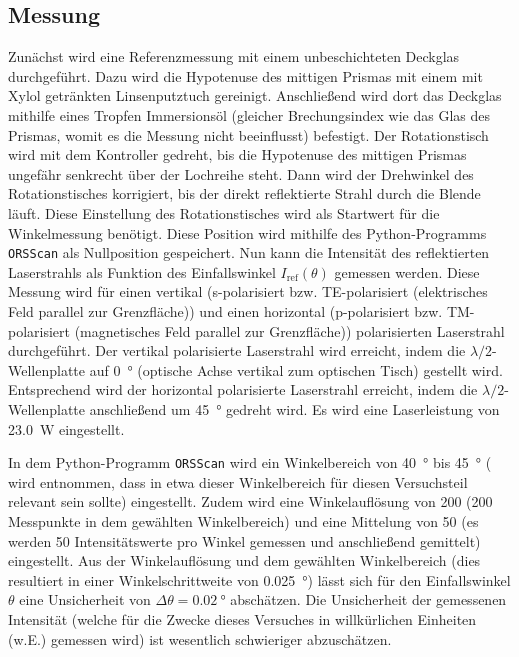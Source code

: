 \subsection{Messung}\label{subsec:teil1_messung}
Zunächst wird eine Referenzmessung mit einem unbeschichteten Deckglas durchgeführt. Dazu wird die Hypotenuse des mittigen Prismas mit einem mit Xylol getränkten
Linsenputztuch gereinigt. Anschließend wird dort das Deckglas mithilfe eines Tropfen Immersionsöl (gleicher Brechungsindex wie das Glas des Prismas, womit es
die Messung nicht beeinflusst) befestigt. Der Rotationstisch wird mit dem Kontroller gedreht, bis die Hypotenuse des mittigen Prismas ungefähr senkrecht über der Lochreihe steht. Dann wird der Drehwinkel des
Rotationstisches korrigiert, bis der direkt reflektierte Strahl durch die Blende läuft. Diese Einstellung des Rotationstisches wird als Startwert für die Winkelmessung
benötigt. Diese Position wird mithilfe des Python-Programms \texttt{ORSScan} als Nullposition gespeichert. Nun kann die Intensität des reflektierten Laserstrahls
als Funktion des Einfallswinkel $I_{\mathrm{ref}}(\theta)$ gemessen werden. Diese Messung wird für einen vertikal (s-polarisiert bzw. TE-polarisiert (elektrisches Feld
parallel zur Grenzfläche)) und einen horizontal (p-polarisiert bzw. TM-polarisiert (magnetisches Feld parallel zur Grenzfläche))
polarisierten Laserstrahl durchgeführt. Der vertikal polarisierte Laserstrahl wird erreicht, indem die $\lambda/2$-Wellenplatte auf \SI{0}{\degree} (optische Achse
vertikal zum optischen Tisch) gestellt wird. Entsprechend wird der horizontal polarisierte Laserstrahl erreicht, indem die $\lambda/2$-Wellenplatte anschließend
um \SI{45}{\degree} gedreht wird. Es wird eine Laserleistung von \SI{23,0}{\watt} eingestellt.\par
In dem Python-Programm \texttt{ORSScan} wird ein Winkelbereich von \SI{40}{\degree} bis \SI{45}{\degree} (\cite{prism} wird entnommen, dass in etwa dieser
Winkelbereich für diesen Versuchsteil relevant sein sollte) eingestellt. Zudem wird eine Winkelauflösung von 200 (200 Messpunkte in dem gewählten Winkelbereich) und
eine Mittelung von 50 (es werden 50 Intensitätswerte pro Winkel gemessen und anschließend gemittelt) eingestellt. Aus der Winkelauflösung und dem gewählten Winkelbereich
(dies resultiert in einer Winkelschrittweite von \SI{0,025}{\degree}) lässt sich für den Einfallswinkel $\theta$ eine Unsicherheit von $\Delta \theta = \SI{0,02}{\degree}$ abschätzen.
Die Unsicherheit der gemessenen Intensität (welche für die Zwecke dieses Versuches in willkürlichen Einheiten (w.E.) gemessen wird) ist wesentlich schwieriger abzuschätzen.
